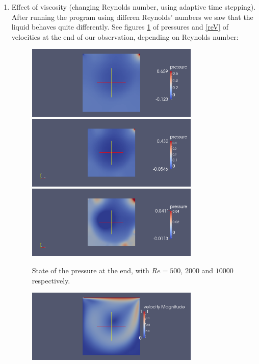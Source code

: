 \documentclass[a4paper]{article}
\begin{document}
\begin{enumerate}
\item Effect of viscosity (changing Reynolds number, using adaptive time stepping).\\
After running the program using differen Reynolds' numbers we saw that the liquid behaves quite differently. See figures \ref{reP} of pressures
and \ref{reV} of velocities at the end of our observation, depending on Reynolds number:

\begin{figure}[hbp!]
\centering
\includegraphics[height= 3.5cm]{Reynolds500_endpressure.png}\\
\includegraphics[height= 3.5cm]{Reynolds2000_endpressure.png}\\
\includegraphics[height= 3.5cm]{Reynolds10000_endpressure.png}
\label{reP}
\caption{State of the pressure at the end, with $Re=500$, $2000$ and $10000$ respectively.}
\end{figure}
\begin{figure}[hbp!]
\centering
\includegraphics[height= 3.5cm]{Reynolds500_endvelocity.png}\\

\end{figure}
\end{enumerate}
\end{document}
